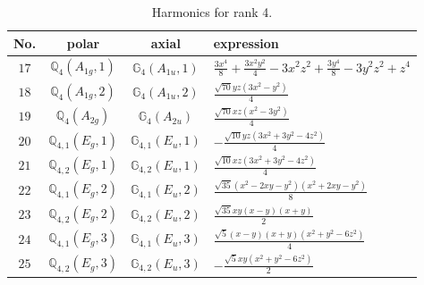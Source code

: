\documentclass[fleqn,8pt,landscape]{jsarticle}
\begin{document}
\begin{table}[ht!]
\begin{center}
\caption{Harmonics for rank 4.}
\renewcommand{\arraystretch}{1.3}
\begin{tabular}{cccl} \hline \hline
No. & polar & axial & expression \\ \hline
$ 17 $ & $ \mathbb{Q}_{4}(A_{1g},1) $ & $ \mathbb{G}_{4}(A_{1u},1) $ & $ \frac{3 x^{4}}{8} + \frac{3 x^{2} y^{2}}{4} - 3 x^{2} z^{2} + \frac{3 y^{4}}{8} - 3 y^{2} z^{2} + z^{4} $ \\
$ 18 $ & $ \mathbb{Q}_{4}(A_{1g},2) $ & $ \mathbb{G}_{4}(A_{1u},2) $ & $ \frac{\sqrt{70} y z \left(3 x^{2} - y^{2}\right)}{4} $ \\
$ 19 $ & $ \mathbb{Q}_{4}(A_{2g}) $ & $ \mathbb{G}_{4}(A_{2u}) $ & $ \frac{\sqrt{70} x z \left(x^{2} - 3 y^{2}\right)}{4} $ \\
$ 20 $ & $ \mathbb{Q}_{4,1}(E_{g},1) $ & $ \mathbb{G}_{4,1}(E_{u},1) $ & $ - \frac{\sqrt{10} y z \left(3 x^{2} + 3 y^{2} - 4 z^{2}\right)}{4} $ \\
$ 21 $ & $ \mathbb{Q}_{4,2}(E_{g},1) $ & $ \mathbb{G}_{4,2}(E_{u},1) $ & $ \frac{\sqrt{10} x z \left(3 x^{2} + 3 y^{2} - 4 z^{2}\right)}{4} $ \\
$ 22 $ & $ \mathbb{Q}_{4,1}(E_{g},2) $ & $ \mathbb{G}_{4,1}(E_{u},2) $ & $ \frac{\sqrt{35} \left(x^{2} - 2 x y - y^{2}\right) \left(x^{2} + 2 x y - y^{2}\right)}{8} $ \\
$ 23 $ & $ \mathbb{Q}_{4,2}(E_{g},2) $ & $ \mathbb{G}_{4,2}(E_{u},2) $ & $ \frac{\sqrt{35} x y \left(x - y\right) \left(x + y\right)}{2} $ \\
$ 24 $ & $ \mathbb{Q}_{4,1}(E_{g},3) $ & $ \mathbb{G}_{4,1}(E_{u},3) $ & $ \frac{\sqrt{5} \left(x - y\right) \left(x + y\right) \left(x^{2} + y^{2} - 6 z^{2}\right)}{4} $ \\
$ 25 $ & $ \mathbb{Q}_{4,2}(E_{g},3) $ & $ \mathbb{G}_{4,2}(E_{u},3) $ & $ - \frac{\sqrt{5} x y \left(x^{2} + y^{2} - 6 z^{2}\right)}{2} $ \\
 \hline \hline
\end{tabular}
\end{center}
\end{table}
\end{document}
